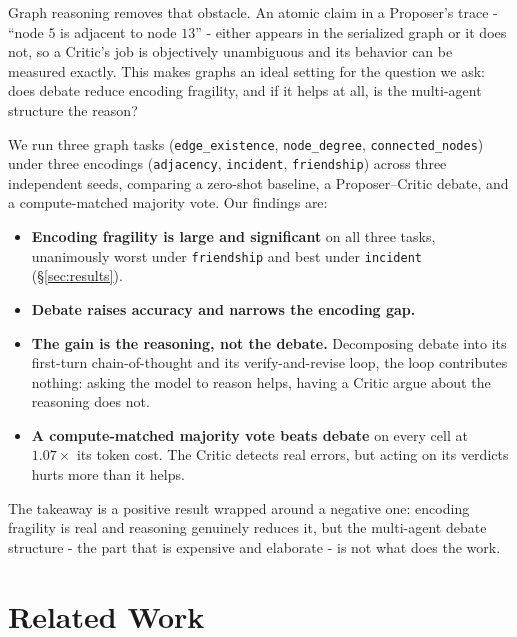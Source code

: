 \documentclass[11pt]{article}
\begin{document}
Graph reasoning removes that obstacle. An atomic claim in a Proposer's
trace - ``node $5$ is adjacent to node $13$'' - either appears in the serialized
graph or it does not, so a Critic's job is objectively unambiguous and its behavior
can be measured exactly. This makes graphs an ideal setting for the question we
ask: does debate reduce encoding fragility, and if it helps at all, is the
multi-agent structure the reason?

We run three graph tasks (\texttt{edge\_existence}, \texttt{node\_degree},
\texttt{connected\_nodes}) under three encodings (\texttt{adjacency},
\texttt{incident}, \texttt{friendship}) across three independent seeds, comparing a
zero-shot baseline, a Proposer--Critic debate, and a compute-matched majority vote.
Our findings are:

\begin{itemize}[nosep]
  \item \textbf{Encoding fragility is large and significant} on all three tasks,
    unanimously worst under \texttt{friendship} and best under \texttt{incident}
    (\S\ref{sec:results}).
  \item \textbf{Debate raises accuracy and narrows the encoding gap.}
  \item \textbf{The gain is the reasoning, not the debate.} Decomposing
    debate into its first-turn chain-of-thought and its verify-and-revise loop,
    the loop contributes nothing: asking the model to reason helps, having a Critic
    argue about the reasoning does not.
  \item \textbf{A compute-matched majority vote beats debate} on every cell at
    $1.07\times$ its token cost. The Critic detects real errors, but acting on
    its verdicts hurts more than it helps.
\end{itemize}

\noindent The takeaway is a positive result wrapped around a negative one: encoding
fragility is real and reasoning genuinely reduces it, but the multi-agent debate
structure - the part that is expensive and elaborate - is not what does the work.

\section{Related Work}
\label{sec:related}
\end{document}
